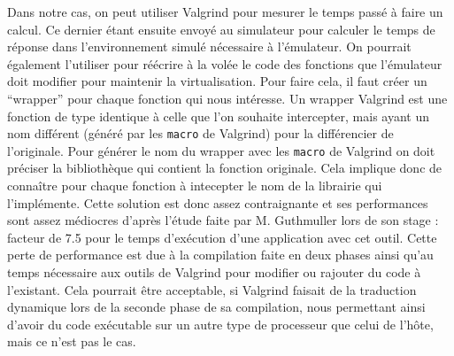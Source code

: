 Dans notre cas, on peut utiliser Valgrind pour mesurer le temps passé à faire un
calcul. Ce dernier étant ensuite envoyé au simulateur pour calculer le temps de
réponse dans l'environnement simulé nécessaire à l'émulateur. On pourrait
également l'utiliser pour réécrire à la volée le code des fonctions que
l'émulateur doit modifier pour maintenir la virtualisation. Pour faire cela, il
faut créer un ``wrapper'' pour chaque fonction qui nous intéresse. Un wrapper
Valgrind est une fonction de type identique à celle que l'on souhaite
intercepter, mais ayant un nom différent (généré par les \texttt{macro} de
Valgrind) pour la différencier de l'originale. Pour générer le nom du wrapper
avec les \texttt{macro} de Valgrind on doit préciser la bibliothèque qui
contient la fonction originale.%
Cela implique donc de connaître pour chaque fonction à intecepter le nom de la
librairie qui l'implémente. Cette solution est donc assez contraignante et ses
performances sont assez médiocres d'après l'étude faite par M. Guthmuller lors
de son stage \citep{MARION:Interception}: facteur de 7.5 pour le temps
d'exécution d'une application avec cet outil. Cette perte de performance est due
à la compilation faite en deux phases ainsi qu'au temps nécessaire aux outils de
Valgrind pour modifier ou rajouter du code à l'existant. Cela pourrait être
acceptable, si Valgrind faisait de la traduction dynamique lors de la seconde
phase de sa compilation, nous permettant ainsi d'avoir du code exécutable sur un
autre type de processeur que celui de l'hôte, mais ce n'est pas le cas.
